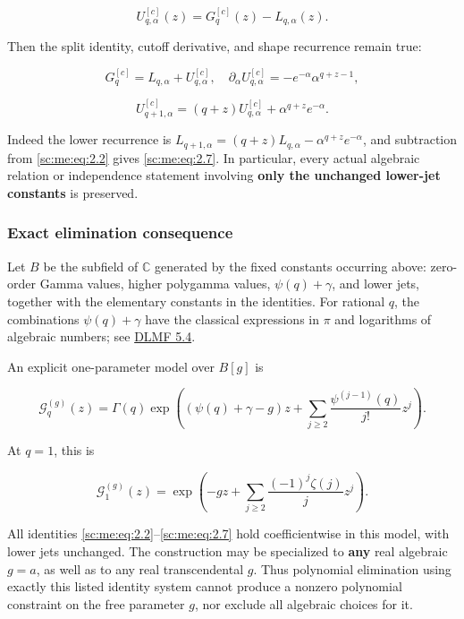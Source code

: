 \documentclass[11pt,a4paper]{article}
\theoremstyle{definition}
\theoremstyle{remark}
\theoremstyle{plain}
\numberwithin{equation}{section}
\begin{document}
\[
U_{q,\alpha}^{[c]}(z)=G_q^{[c]}(z)-L_{q,\alpha}(z).
\tag{ME.2.6}\label{sc:me:eq:2.6}
\]

Then the split identity, cutoff derivative, and shape recurrence remain
true:

\[
G_q^{[c]}=L_{q,\alpha}+U_{q,\alpha}^{[c]},
\quad
\partial_\alpha U_{q,\alpha}^{[c]}
=-e^{-\alpha}\alpha^{q+z-1},
\]

\[
U_{q+1,\alpha}^{[c]}
=(q+z)U_{q,\alpha}^{[c]}+\alpha^{q+z}e^{-\alpha}.
\tag{ME.2.7}\label{sc:me:eq:2.7}
\]

Indeed the lower recurrence is
\(L_{q+1,\alpha}=(q+z)L_{q,\alpha}-\alpha^{q+z}e^{-\alpha}\), and
subtraction from \eqref{sc:me:eq:2.2} gives \eqref{sc:me:eq:2.7}. In particular, every actual
algebraic relation or independence statement involving \textbf{only the
unchanged lower-jet constants} is preserved.

\subsubsection{Exact elimination
consequence}\label{sc:me:exact-elimination-consequence}

Let \(B\) be the subfield of \(\mathbb C\) generated by the fixed
constants occurring above: zero-order Gamma values, higher polygamma
values, \(\psi(q)+\gamma\), and lower jets, together with the elementary
constants in the identities. For rational \(q\), the combinations
\(\psi(q)+\gamma\) have the classical expressions in \(\pi\) and
logarithms of algebraic numbers; see
\href{https://dlmf.nist.gov/5.4}{DLMF 5.4}.

An explicit one-parameter model over \(B[g]\) is

\[
\mathcal G_q^{(g)}(z)=\Gamma(q)
\exp\left((\psi(q)+\gamma-g)z+
\sum_{j\ge2}\frac{\psi^{(j-1)}(q)}{j!}z^j\right).
\tag{ME.2.8}\label{sc:me:eq:2.8}
\]

At \(q=1\), this is

\[
\mathcal G_1^{(g)}(z)
=\exp\left(-gz+\sum_{j\ge2}\frac{(-1)^j\zeta(j)}jz^j\right).
\]

All identities \eqref{sc:me:eq:2.2}--\eqref{sc:me:eq:2.7} hold coefficientwise in this model, with
lower jets unchanged. The construction may be specialized to
\textbf{any} real algebraic \(g=a\), as well as to any real
transcendental \(g\). Thus polynomial elimination using exactly this
listed identity system cannot produce a nonzero polynomial constraint on
the free parameter \(g\), nor exclude all algebraic choices for it.
\end{document}
